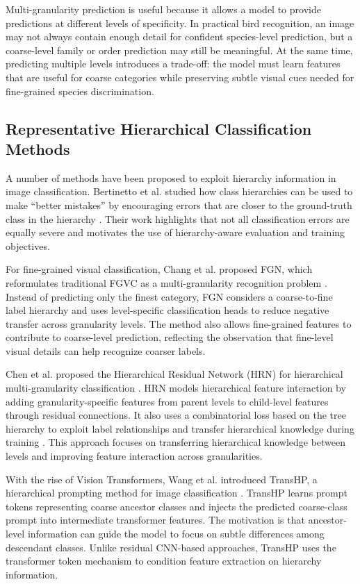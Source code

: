 Multi-granularity prediction is useful because it allows a model to provide predictions at different levels of specificity. In practical bird recognition, an image may not always contain enough detail for confident species-level prediction, but a coarse-level family or order prediction may still be meaningful. At the same time, predicting multiple levels introduces a trade-off: the model must learn features that are useful for coarse categories while preserving subtle visual cues needed for fine-grained species discrimination.

\subsection{Representative Hierarchical Classification Methods}

A number of methods have been proposed to exploit hierarchy information in image classification. Bertinetto et al. studied how class hierarchies can be used to make ``better mistakes'' by encouraging errors that are closer to the ground-truth class in the hierarchy \cite{bertinetto2020making}. Their work highlights that not all classification errors are equally severe and motivates the use of hierarchy-aware evaluation and training objectives.

For fine-grained visual classification, Chang et al. proposed FGN, which reformulates traditional FGVC as a multi-granularity recognition problem \cite{chang2021your}. Instead of predicting only the finest category, FGN considers a coarse-to-fine label hierarchy and uses level-specific classification heads to reduce negative transfer across granularity levels. The method also allows fine-grained features to contribute to coarse-level prediction, reflecting the observation that fine-level visual details can help recognize coarser labels.

Chen et al. proposed the Hierarchical Residual Network (HRN) for hierarchical multi-granularity classification \cite{Chen_2022_CVPR}. HRN models hierarchical feature interaction by adding granularity-specific features from parent levels to child-level features through residual connections. It also uses a combinatorial loss based on the tree hierarchy to exploit label relationships and transfer hierarchical knowledge during training \cite{Chen_2022_CVPR}. This approach focuses on transferring hierarchical knowledge between levels and improving feature interaction across granularities.

With the rise of Vision Transformers, Wang et al. introduced TransHP, a hierarchical prompting method for image classification \cite{wang2023transhp}. TransHP learns prompt tokens representing coarse ancestor classes and injects the predicted coarse-class prompt into intermediate transformer features. The motivation is that ancestor-level information can guide the model to focus on subtle differences among descendant classes. Unlike residual CNN-based approaches, TransHP uses the transformer token mechanism to condition feature extraction on hierarchy information.

